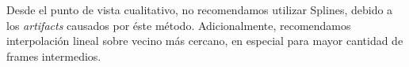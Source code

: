 \par Desde el punto de vista cualitativo, no recomendamos utilizar Splines, debido a los \textit{artifacts} causados por \'este m\'etodo. Adicionalmente, recomendamos interpolaci\'on lineal sobre vecino m\'as cercano, en especial para mayor cantidad de frames intermedios.
